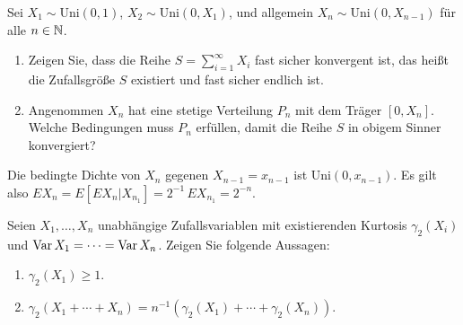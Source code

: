
 Sei $X_{1} \sim \text{Uni}(0,1)$,
$X_2 \sim \text{Uni}(0,X_1)$, und allgemein $X_{n} \sim \text{Uni}(0,X_{n-1})$ für alle
$n \in \mathbb N$. 
\begin{enumerate}
    \item Zeigen Sie, dass die Reihe $S=\sum_{i=1}^{\infty} X_i$ fast sicher konvergent ist, das heißt
        die Zufallsgröße $S$ existiert und fast sicher endlich ist.
    \item Angenommen $X_n$ hat eine stetige Verteilung $P_n$ mit dem Träger $[0,X_n]$. Welche 
        Bedingungen muss $P_n$ erfüllen, damit die Reihe $S$ in obigem Sinner konvergiert?
\end{enumerate}

\solution Die bedingte Dichte von $X_n$ gegenen $X_{n-1} = x_{n-1}$ ist
$\text{Uni}(0,x_{n-1})$.  Es gilt also $E X_{n} = E \left[ E X_{n} | X_{n_1}
\right] = 2^{-1} \, E X_{n_1} = 2^{-n}$.


 Seien $X_1,\dots ,X_n$ unabhängige
Zufallsvariablen mit existierenden Kurtosis $\gamma_{2}(X_i)$ und $\operatorname{Var} X_1 =
\cdots = \operatorname{Var} X_n$. Zeigen Sie folgende Aussagen: 
\begin{enumerate}
    \item $\gamma_{2}(X_1) \geq 1$.
    \item $\gamma_{2}( X_{1} + \cdots + X_n ) = n^{-1} \left( \gamma_{2}(X_1) +
        \cdots + \gamma_{2}(X_n) \right)$.
\end{enumerate}


%


